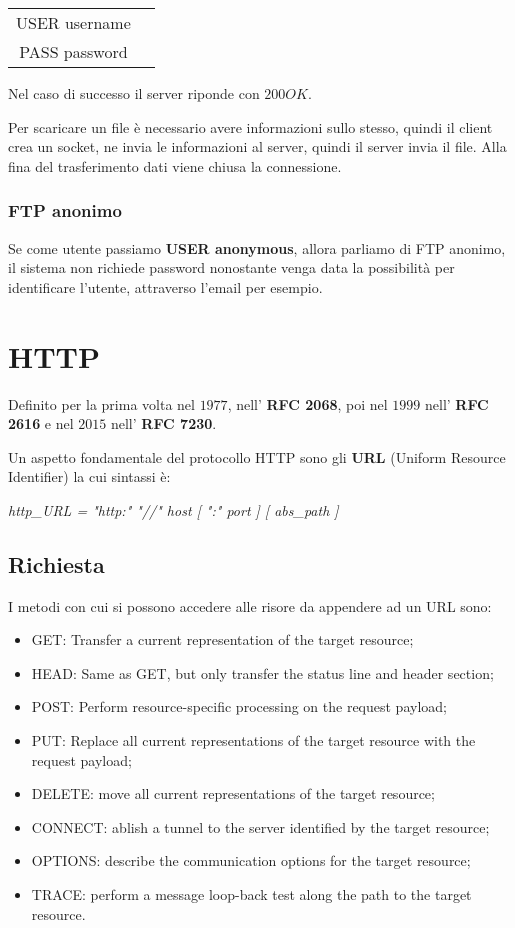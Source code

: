 \begin{tabular}{c c}
USER username\\
PASS password
\end{tabular}

Nel caso di successo il server riponde con $200OK$.


Per scaricare un file è necessario avere informazioni sullo stesso, quindi
il client crea un socket, ne invia le informazioni al server, quindi il
server invia il file.
Alla fina del trasferimento dati viene chiusa la connessione.

\subsection{FTP anonimo}
Se come utente passiamo \textbf{USER anonymous}, allora parliamo di FTP
anonimo, il sistema non richiede password nonostante venga data la
possibilità per identificare l'utente, attraverso l'email per esempio.

\chapter{HTTP}
Definito per la prima volta nel $1977$, nell' \textbf{RFC 2068}, poi nel $1999$
nell' \textbf{RFC 2616} e nel $2015$ nell' \textbf{RFC 7230}.

Un aspetto fondamentale del protocollo HTTP sono gli \textbf{URL} (Uniform
Resource Identifier) la cui sintassi è:

\emph{http\_URL = "http:" "//" host [ ":" port ] [ abs\_path ]}

\section{Richiesta}
I metodi con cui si possono accedere alle risore da appendere ad un URL sono:
\begin{itemize}
  \item GET: Transfer a current representation of the target resource;
  \item HEAD: Same as GET, but only transfer the status line and header
    section;
  \item POST: Perform resource-specific processing on the    request payload;
  \item PUT:  Replace all current representations of the target resource with
    the request payload;
  \item DELETE: move all current representations of the target resource;
  \item CONNECT: ablish a tunnel to the server identified by the target
    resource;
  \item OPTIONS: describe the communication options for the target resource;
  \item TRACE: perform a message loop-back test along the path to the target
    resource.
\end{itemize}

